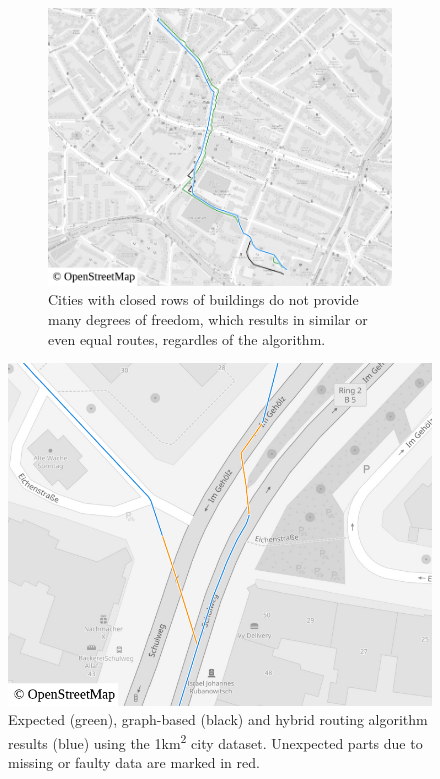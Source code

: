 \begin{figure}[h!]
\begin{minipage}[t]{.48\textwidth}
\begin{subfigure}[t]{\linewidth}
\begin{figcenter}
							\includegraphics[width=\textwidth]{images/qgis-routing-city-routing-18}
						\end{figcenter}
						\caption{Cities with closed rows of buildings do not provide many degrees of freedom, which results in similar or even equal routes, regardles of the algorithm.}
						\label{fig:eval-city-usefulness-d}
					\end{subfigure}
				\end{minipage}
				\caption{Expected (green), graph-based (black) and hybrid routing algorithm results (blue) using the 1km\textsuperscript{2} city dataset. Unexpected parts due to missing or faulty data are marked in red.}
				\label{fig:eval-city-usefulness}
				\begin{minipage}[t]{.48\textwidth}
					\begin{figcenter}
						\includegraphics[width=\textwidth]{images/qgis-routing-city-roads}

\end{figcenter}
\end{minipage}
\end{figure}
